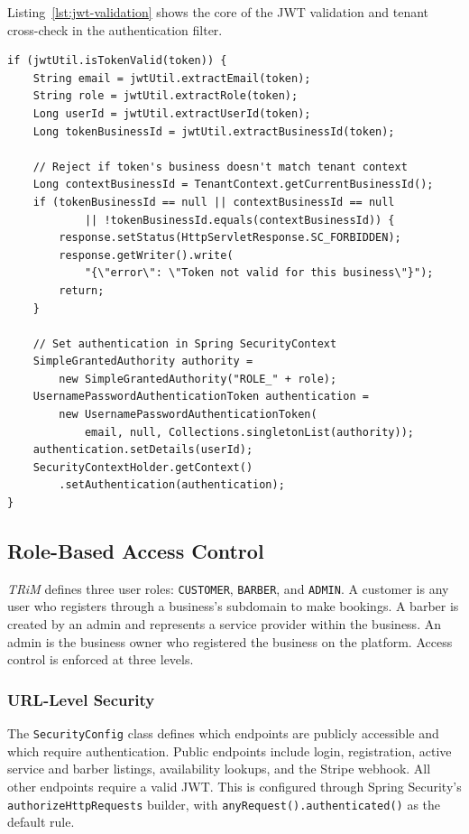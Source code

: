 Listing~\ref{lst:jwt-validation} shows the core of the JWT validation and tenant cross-check in the authentication filter.

\begin{lstlisting}[caption={JWT authentication filter with multi-tenant validation.}, label={lst:jwt-validation}]
if (jwtUtil.isTokenValid(token)) {
    String email = jwtUtil.extractEmail(token);
    String role = jwtUtil.extractRole(token);
    Long userId = jwtUtil.extractUserId(token);
    Long tokenBusinessId = jwtUtil.extractBusinessId(token);

    // Reject if token's business doesn't match tenant context
    Long contextBusinessId = TenantContext.getCurrentBusinessId();
    if (tokenBusinessId == null || contextBusinessId == null
            || !tokenBusinessId.equals(contextBusinessId)) {
        response.setStatus(HttpServletResponse.SC_FORBIDDEN);
        response.getWriter().write(
            "{\"error\": \"Token not valid for this business\"}");
        return;
    }

    // Set authentication in Spring SecurityContext
    SimpleGrantedAuthority authority =
        new SimpleGrantedAuthority("ROLE_" + role);
    UsernamePasswordAuthenticationToken authentication =
        new UsernamePasswordAuthenticationToken(
            email, null, Collections.singletonList(authority));
    authentication.setDetails(userId);
    SecurityContextHolder.getContext()
        .setAuthentication(authentication);
}
\end{lstlisting}

\subsection*{Role-Based Access Control}
\textit{TRiM} defines three user roles: \texttt{CUSTOMER}, \texttt{BARBER}, and \texttt{ADMIN}. A customer is any user who registers through a business's subdomain to make bookings. A barber is created by an admin and represents a service provider within the business. An admin is the business owner who registered the business on the platform. Access control is enforced at three levels.

\subsubsection*{URL-Level Security}
The \texttt{SecurityConfig} class defines which endpoints are publicly accessible and which require authentication. Public endpoints include login, registration, active service and barber listings, availability lookups, and the Stripe webhook. All other endpoints require a valid JWT. This is configured through Spring Security's \texttt{authorizeHttpRequests} builder, with \texttt{anyRequest().authenticated()} as the default rule.

